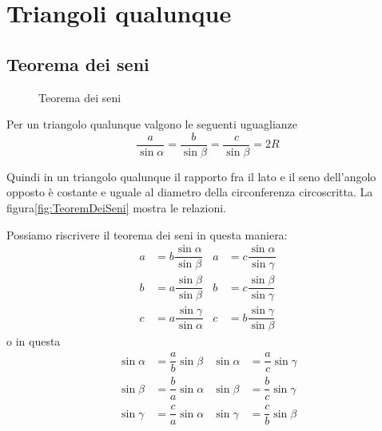 \section{Triangoli qualunque}
\subsection{Teorema dei seni}
\begin{figure}
	\centering
	
	\caption{Teorema dei seni}
	\label{fig:TeoremDeiSeni}
\end{figure}
Per un triangolo qualunque valgono le seguenti uguaglianze\[\dfrac{a}{\sin\alpha}=\dfrac{b}{\sin\beta}=\dfrac{c}{\sin\beta}=2R \]

Quindi in un triangolo qualunque il rapporto fra il lato e il seno dell'angolo opposto è costante e uguale al diametro della circonferenza circoscritta. La figura\nobs\vref{fig:TeoremDeiSeni} mostra le relazioni.

Possiamo riscrivere il teorema dei seni in questa maniera: 
\begin{align*}
a&=b\dfrac{\sin\alpha}{\sin\beta}& a&=c\dfrac{\sin\alpha}{\sin\gamma}\\
b&=a\dfrac{\sin\beta}{\sin\beta}& b&=c\dfrac{\sin\beta}{\sin\gamma}\\
c&=a\dfrac{\sin\gamma}{\sin\alpha}& c&=b\dfrac{\sin\gamma}{\sin\beta}
\end{align*}
o in questa
\begin{align*}
\sin\alpha&=\dfrac{a}{b}\sin\beta&\sin\alpha&=\dfrac{a}{c}\sin\gamma\\
\sin\beta&=\dfrac{b}{a}\sin\alpha&\sin\beta&=\dfrac{b}{c}\sin\gamma\\
\sin\gamma&=\dfrac{c}{a}\sin\alpha&\sin\gamma&=\dfrac{c}{b}\sin\beta\\
\end{align*}
